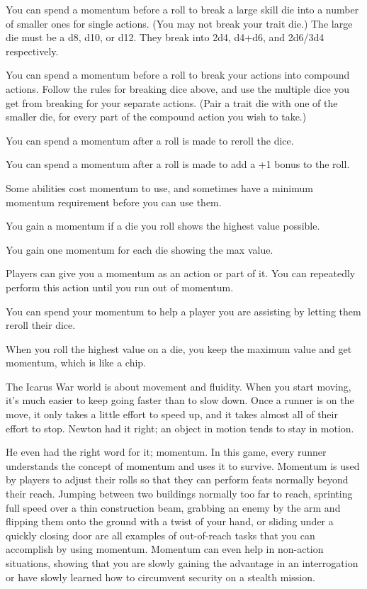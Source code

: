 \documentclass{article}
\begin{document}
You can spend a momentum before a roll to break a large skill die into a number of smaller ones for single actions. (You may not break your trait die.) The large die must be a d8, d10, or d12. They break into 2d4, d4+d6, and 2d6/3d4 respectively.

You can spend a momentum before a roll to break your actions into compound actions. Follow the rules for breaking dice above, and use the multiple dice you get from breaking for your separate actions. (Pair a trait die with one of the smaller die, for every part of the compound action you wish to take.)

You can spend a momentum after a roll is made to reroll the dice.

You can spend a momentum after a roll is made to add a +1 bonus to the roll.

Some abilities cost momentum to use, and sometimes have a minimum momentum requirement before you can use them.

You gain a momentum if a die you roll shows the highest value possible.

You gain one momentum for each die showing the max value.

Players can give you a momentum as an action or part of it. You can repeatedly perform this action until you run out of momentum.

You can spend your momentum to help a player you are assisting by letting them reroll their dice.

When you roll the highest value on a die, you keep the maximum value and get momentum, which is like a chip.

The Icarus War world is about movement and fluidity. When you start moving, it’s much easier to keep going faster than to slow down. Once a runner is on the move, it only takes a little effort to speed up, and it takes almost all of their effort to stop. Newton had it right; an object in motion tends to stay in motion.

He even had the right word for it; momentum. In this game, every runner understands the concept of momentum and uses it to survive. Momentum is used by players to adjust their rolls so that they can perform feats normally beyond their reach. Jumping between two buildings normally too far to reach, sprinting full speed over a thin construction beam, grabbing an enemy by the arm and flipping them onto the ground with a twist of your hand, or sliding under a quickly closing door are all examples of out-of-reach tasks that you can accomplish by using momentum. Momentum can even help in non-action situations, showing that you are slowly gaining the advantage in an interrogation or have slowly learned how to circumvent security on a stealth mission.
\end{document}
